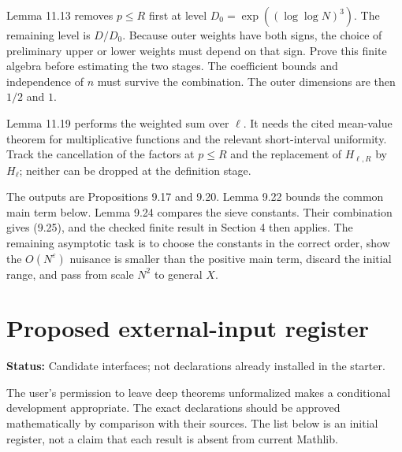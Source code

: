 \documentclass[11pt]{article}
\newcommand{\status}[1]{\textbf{Status:} #1.}
\newcommand{\page}{\newpage}
\begin{document}
Lemma 11.13 removes \(p\le R\) first at level
\(D_0=\exp((\log\log N)^3)\). The remaining level is \(D/D_0\).
Because outer weights have both signs, the choice of preliminary upper or lower
weights must depend on that sign. Prove this finite algebra before estimating
the two stages. The coefficient bounds and independence of \(n\) must survive
the combination. The outer dimensions are then \(1/2\) and \(1\).

Lemma 11.19 performs the weighted sum over \(\ell\). It needs the cited mean-value
theorem for multiplicative functions and the relevant short-interval uniformity.
Track the cancellation of the factors at \(p\le R\) and the replacement of
\(H_{\ell,R}\) by \(H_\ell\); neither can be dropped at the definition stage.

The outputs are Propositions 9.17 and 9.20. Lemma 9.22 bounds the common main
term below. Lemma 9.24 compares the sieve constants. Their combination gives
(9.25), and the checked finite result in Section 4 then applies. The remaining
asymptotic task is to choose the constants in the correct order, show the
\(O(N^{\varepsilon})\) nuisance is smaller than the positive main term, discard
the initial range, and pass from scale \(N^2\) to general \(X\).

\page
\section{Proposed external-input register}
\status{Candidate interfaces; not declarations already installed in the starter}

The user's permission to leave deep theorems unformalized makes a conditional
development appropriate. The exact declarations should be approved mathematically
by comparison with their sources. The list below is an initial register, not a
claim that each result is absent from current Mathlib.
\end{document}
